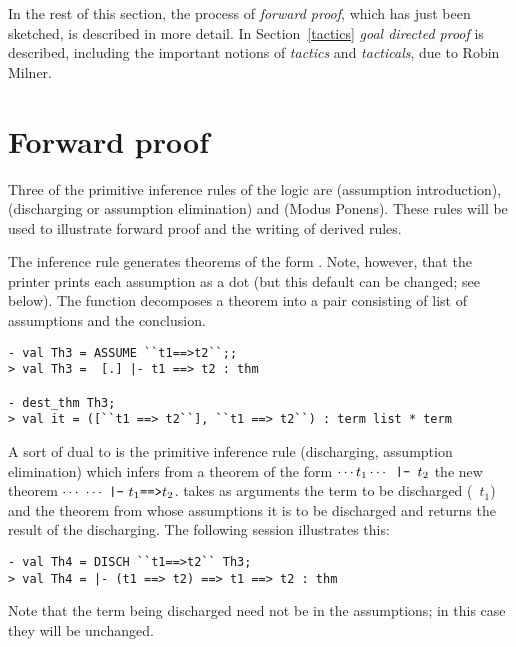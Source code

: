 In the rest of this section, the process of {\it forward proof\/},
which has just been sketched, is described in more detail.  In
Section~\ref{tactics} {\it goal directed proof\/} is described,
including the important notions of {\it tactics\/} and {\it
  tacticals\/}, due to Robin Milner.

\section{Forward proof}
\label{forward}

Three of the primitive inference rules of the \HOL{} logic are
 (assumption introduction),  (discharging or
assumption elimination) and  (Modus Ponens).  These rules will
be used to illustrate forward proof and the writing of derived rules.

The inference rule  generates theorems of the form . Note, however, that the \ML{} printer prints each
assumption as a dot (but this default can be changed; see below).  The
function  decomposes a theorem into a pair consisting of
list of assumptions and the conclusion.

\begin{session}
\begin{verbatim}
- val Th3 = ASSUME ``t1==>t2``;;
> val Th3 =  [.] |- t1 ==> t2 : thm

- dest_thm Th3;
> val it = ([``t1 ==> t2``], ``t1 ==> t2``) : term list * term
\end{verbatim}
\end{session}

A sort of dual to  is the primitive inference rule
 (discharging, assumption elimination) which infers from
a theorem of the form $\cdots t_1\cdots\ml{\ |-\ }t_2$ the new theorem
$\cdots\ \cdots\ \ml{|-}\ t_1\ml{==>}t_2$.  takes as arguments
the term to be discharged (\ie\ $t_1$) and the theorem from whose
assumptions it is to be discharged and returns the result of the discharging.
The following session illustrates this:

\begin{session}
\begin{verbatim}
- val Th4 = DISCH ``t1==>t2`` Th3;
> val Th4 = |- (t1 ==> t2) ==> t1 ==> t2 : thm
\end{verbatim}
\end{session}
Note that the term being discharged need not be in the assumptions; in
this case they will be unchanged.

